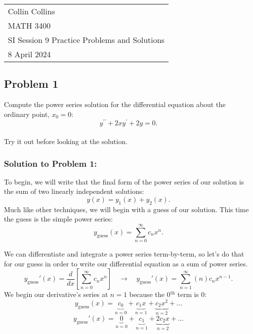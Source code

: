 \documentclass[a4paper,12pt]{article}
\begin{document}

\thispagestyle{empty} %

\begin{tabular}{p{15.5cm}} %
\\ Collin Collins \\
MATH 3400\\
SI Session 9 Practice Problems and Solutions\\
8 April 2024 \\
\hline %

\end{tabular} 

\subsection*{Problem 1} Compute the power series solution for the differential equation about the ordinary point, $x_{0}=0$:
$$y^{\prime \prime}+2 x y^{\prime}+2 y=0. $$
\\
 
Try it out before looking at the solution.
\pagebreak
 
 \subsubsection*{Solution to Problem 1:}
 To begin, we will write that the final form of the power series of our solution is the sum of two linearly independent solutions:
 $$ y(x) = y_1(x) + y_2(x). $$
Much like other techniques, we will begin with a guess of our solution. This time the guess is the simple power series:
$$ y_{\text{guess}}(x) = \sum_{n=0}^{\infty} c_nx^n. $$

We can differentiate and integrate a power series term-by-term, so let's do that for our guess in order to write our differential equation as a sum of power series.
$$ y_{\text{guess}}'(x) = \frac{d}{dx}\left[\sum_{n=0}^{\infty} c_nx^n\right] \quad\rightarrow\quad y_{\text{guess}}'(x) = \sum_{n=1}^{\infty} (n)c_nx^{n-1}. $$
We begin our derivative's series at $n=1$ because the 0$^{\text{th}}$ term is 0:
$$ y_{\text{guess}}(x) = \underbrace{c_0}_{n=0} + \underbrace{c_1x}_{n=1} + \underbrace{c_2x^2}_{n=2}+\ldots $$
$$ y_{\text{guess}}'(x) = \underbrace{0}_{n=0} + \underbrace{c_1}_{n=1} + \underbrace{2c_2x}_{n=2} +\ldots $$
\end{document}
